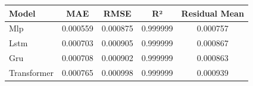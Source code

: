\begin{tabular}{lcccc}
\toprule
Model & MAE & RMSE & R² & Residual Mean \\
\midrule
Mlp & 0.000559 & 0.000875 & 0.999999 & 0.000757 \\
Lstm & 0.000703 & 0.000905 & 0.999999 & 0.000867 \\
Gru & 0.000708 & 0.000902 & 0.999999 & 0.000863 \\
Transformer & 0.000765 & 0.000998 & 0.999999 & 0.000939 \\
\bottomrule
\end{tabular}
